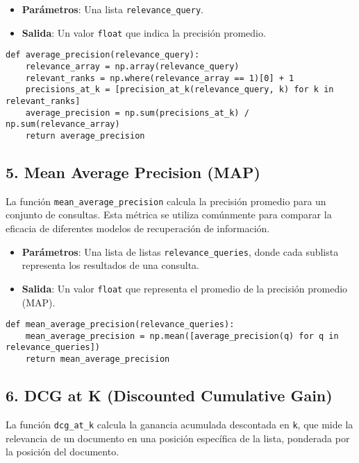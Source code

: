 \documentclass[11pt,english]{article}
\theoremstyle{plain}
\begin{document}
\begin{itemize}
    \item \textbf{Parámetros}: Una lista \texttt{relevance\_query}.
    \item \textbf{Salida}: Un valor \texttt{float} que indica la precisión promedio.
\end{itemize}

\begin{verbatim}
def average_precision(relevance_query):
    relevance_array = np.array(relevance_query)
    relevant_ranks = np.where(relevance_array == 1)[0] + 1
    precisions_at_k = [precision_at_k(relevance_query, k) for k in relevant_ranks]
    average_precision = np.sum(precisions_at_k) / np.sum(relevance_array)
    return average_precision
\end{verbatim}

\subsection*{5. Mean Average Precision (MAP)}

La función \texttt{mean\_average\_precision} calcula la precisión promedio para un conjunto de consultas. Esta métrica se utiliza comúnmente para comparar la eficacia de diferentes modelos de recuperación de información.

\begin{itemize}
    \item \textbf{Parámetros}: Una lista de listas \texttt{relevance\_queries}, donde cada sublista representa los resultados de una consulta.
    \item \textbf{Salida}: Un valor \texttt{float} que representa el promedio de la precisión promedio (MAP).
\end{itemize}

\begin{verbatim}
def mean_average_precision(relevance_queries):
    mean_average_precision = np.mean([average_precision(q) for q in relevance_queries])
    return mean_average_precision
\end{verbatim}

\subsection*{6. DCG at K (Discounted Cumulative Gain)}

La función \texttt{dcg\_at\_k} calcula la ganancia acumulada descontada en \texttt{k}, que mide la relevancia de un documento en una posición específica de la lista, ponderada por la posición del documento.
\end{document}
